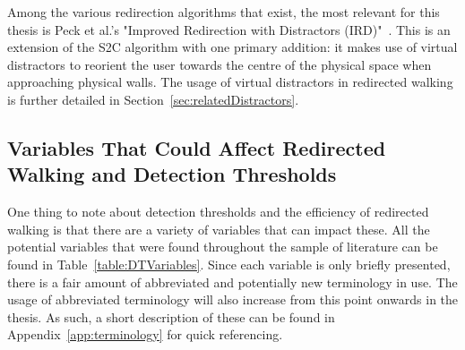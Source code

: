 Among the various redirection algorithms that exist, the most relevant for this thesis is Peck et al.'s "Improved Redirection with Distractors (IRD)"~\cite{peck2010improved}. This is an extension of the S2C algorithm with one primary addition: it makes use of virtual distractors to reorient the user towards the centre of the physical space when approaching physical walls. The usage of virtual distractors in redirected walking is further detailed in Section~\ref{sec:relatedDistractors}.

\subsection{Variables That Could Affect Redirected Walking and Detection Thresholds}
One thing to note about detection thresholds and the efficiency of redirected walking is that there are a variety of variables that can impact these. All the potential variables that were found throughout the sample of literature can be found in Table~\ref{table:DTVariables}. Since each variable is only briefly presented, there is a fair amount of abbreviated and potentially new terminology in use. The usage of abbreviated terminology will also increase from this point onwards in the thesis. As such, a short description of these can be found in Appendix~\ref{app:terminology} for quick referencing.

